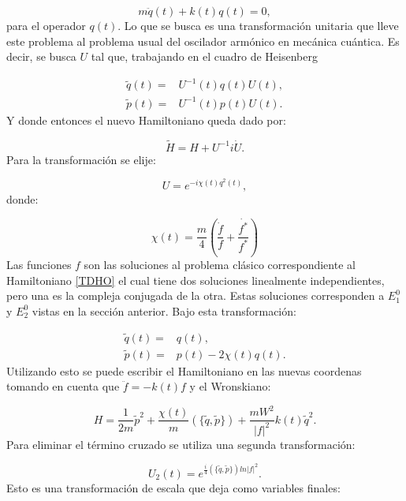 \documentclass[a4paper,10pt]{report}
\begin{document}
\begin{equation}
m\ddot{q}(t) + k(t)q(t) = 0,
\end{equation} para el operador $q(t)$. Lo que se busca es una transformación unitaria que lleve este problema al problema usual del oscilador armónico en mecánica cuántica. Es decir, se busca $U$ tal que, trabajando en el cuadro de Heisenberg \cite{SakuraiQM}

\begin{align}
\tilde{q}(t) =& U^{-1}(t)q(t)U(t),\\
\tilde{p}(t) =& U^{-1}(t)p(t)U(t).
\end{align} Y donde entonces el nuevo Hamiltoniano queda dado por:

\begin{equation}
\tilde{H} = H + U^{-1}i\dot{U}.
\end{equation} Para la transformación se elije:

\begin{equation}
U = e^{-i\chi(t)q^2(t)},
\end{equation} donde:

\begin{equation}
\chi(t) = \frac{m}{4}(\frac{\dot{f}}{f}+\frac{\dot{f^*}}{f^*})
\end{equation} Las funciones $f$ son las soluciones al problema clásico correspondiente al Hamiltoniano \ref{TDHO} el cual tiene dos soluciones linealmente independientes, pero una es la compleja conjugada de la otra. Estas soluciones corresponden a $E_1^0$  y $E_2^0$ vistas en la sección anterior. Bajo esta transformación:

\begin{align}
\tilde{q}(t)=&q(t),\\
\tilde{p}(t)=&p(t)-2\chi(t)q(t).
\end{align}Utilizando esto se puede escribir el Hamiltoniano en las nuevas coordenas tomando en cuenta que $\ddot{f}= -k(t)f$ y el Wronskiano:

\begin{equation}
 H = \frac{1}{2m}\tilde{p}^2 + \frac{\chi(t)}{m}(\{\tilde{q},\tilde{p}\}) + \frac{mW^2}{|f|^2}k(t)\tilde{q}^2.
\end{equation}Para eliminar el término cruzado se utiliza una segunda transformación:

\begin{equation}
U_2(t)=e^{\frac{i}{4}(\{\tilde{q},\tilde{p}\})ln|f|^2}.
\end{equation}Esto es una transformación de escala que deja como variables finales:
\end{document}
